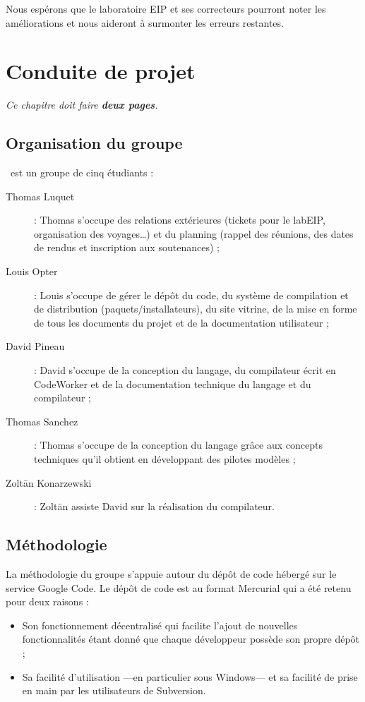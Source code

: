 \documentclass[francais]{rtxreport}
\begin{document}
Nous espérons que le laboratoire EIP et ses correcteurs pourront noter les
améliorations et nous aideront à surmonter les erreurs restantes.

\chapter{Conduite de projet}

\emph{Ce chapitre doit faire \textbf{deux pages}.}

\section{Organisation du groupe}

\rtx\ est un groupe de cinq étudiants :
\begin{description}
\item[Thomas Luquet] : Thomas s'occupe des relations extérieures (tickets pour
  le labEIP, organisation des voyages\ldots) et du planning (rappel des
  réunions, des dates de rendus et inscription aux soutenances) ;
\item[Louis Opter] : Louis s'occupe de gérer le dépôt du code, du système de
  compilation et de distribution (paquets/installateurs), du site vitrine, de la
  mise en forme de tous les documents du projet et de la documentation
  utilisateur ;
\item[David Pineau] : David s'occupe de la conception du langage, du compilateur
  écrit en CodeWorker et de la documentation technique du langage et du
  compilateur ;
\item[Thomas Sanchez] : Thomas s'occupe de la conception du langage grâce aux
  concepts techniques qu'il obtient en développant des pilotes modèles ;
\item[Zolt\={a}n Konarzewski] : Zolt\={a}n assiste David sur la réalisation du
  compilateur.
\end{description}


\section{Méthodologie}

La méthodologie du groupe s'appuie autour du dépôt de code hébergé sur le
service Google Code. Le dépôt de code est au format Mercurial qui a été retenu
pour deux raisons :
\begin{itemize}
\item Son fonctionnement décentralisé qui facilite l'ajout de nouvelles
  fonctionnalités étant donné que chaque développeur possède son propre dépôt ;
\item Sa facilité d'utilisation ---en particulier sous Windows--- et sa facilité
  de prise en main par les utilisateurs de Subversion.
\end{itemize}
\end{document}
